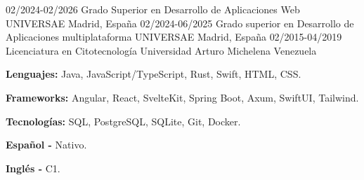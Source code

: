 \documentclass[9pt]{./src/developercv} %
\begin{document}
\vspace{-10 pt}
\begin{entrylist}
	\entry
	{02/2024-02/2026}
	{Grado Superior en Desarrollo de Aplicaciones Web}
	{UNIVERSAE}
	{Madrid, España}
	\entry
	{02/2024-06/2025}
	{Grado superior en Desarrollo de Aplicaciones multiplataforma}
	{UNIVERSAE}
	{Madrid, España}
	\entry
	{02/2015-04/2019}
	{Licenciatura en Citotecnología}
	{Universidad Arturo Michelena}
	{Venezuela}
\end{entrylist}

\vspace{-10 pt}
\begin{minipage}[t]{\textwidth}
\vspace{-6pt}

\begin{minipage}[t]{\textwidth}
		\textbf{Lenguajes:}
		Java, JavaScript/TypeScript, Rust, Swift, HTML, CSS.
	\end{minipage}
	\vspace{-1 pt}

	\begin{minipage}[t]{\textwidth}
		\textbf{Frameworks:}
		Angular, React, SvelteKit, Spring Boot, Axum, SwiftUI, Tailwind.
	\end{minipage}
	\vspace{-1 pt}

	\begin{minipage}[t]{\textwidth}
		\textbf{Tecnologías:}
		SQL, PostgreSQL, SQLite, Git, Docker.
	\end{minipage}
\end{minipage}

\vspace{10 pt}
\begin{minipage}[t]{\textwidth}
	\vspace{-6pt}

	\begin{minipage}[t]{\textwidth}
		\textbf{Español - }
		Nativo.
	\end{minipage}
	\vspace{-1 pt}

	\begin{minipage}[t]{\textwidth}
		\textbf{Inglés - }
		C1.
	\end{minipage}
\end{minipage}
\end{document}
